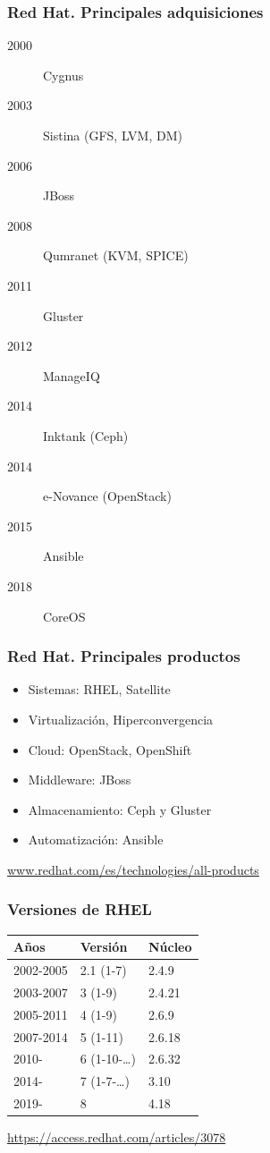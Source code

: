 \documentclass{beamer}
\begin{document}
\begin{frame}
  \frametitle{Red Hat. Principales adquisiciones}
  \begin{description}
  \item[2000] Cygnus
  \item[2003] Sistina (GFS, LVM, DM)
  \item[2006] JBoss
  \item[2008] Qumranet (KVM, SPICE)
  \item[2011] Gluster
  \item[2012] ManageIQ
  \item[2014] Inktank (Ceph)
  \item[2014] e-Novance (OpenStack)
  \item[2015] Ansible
  \item[2018] CoreOS
  \end{description}
\end{frame}

\begin{frame}
  \frametitle{Red Hat. Principales productos}
  \begin{itemize}
  \item Sistemas: RHEL, Satellite
  \item Virtualización, Hiperconvergencia
  \item Cloud: OpenStack, OpenShift
  \item Middleware: JBoss
  \item Almacenamiento: Ceph y Gluster
  \item Automatización: Ansible
  \end{itemize}
  \href{https://www.redhat.com/es/technologies/all-products}{www.redhat.com/es/technologies/all-products}
\end{frame}

\begin{frame}
  \frametitle{Versiones de RHEL}
  \begin{center}
    \begin{tabular}{lll}
      \hline
      \hline
      Años&Versión&Núcleo\\
      \hline
      2002-2005& 2.1 (1-7)& 2.4.9\\
      2003-2007&3 (1-9)&2.4.21\\
      2005-2011&4 (1-9)&2.6.9\\
      2007-2014&5 (1-11)&2.6.18\\
      2010-&6 (1-10-\ldots)&2.6.32\\
      2014-&7 (1-7-\ldots)&3.10\\
      2019-&8 &4.18\\
      \hline
      \hline
    \end{tabular}
  \end{center}
  \url{https://access.redhat.com/articles/3078}
\end{frame}
\end{document}
